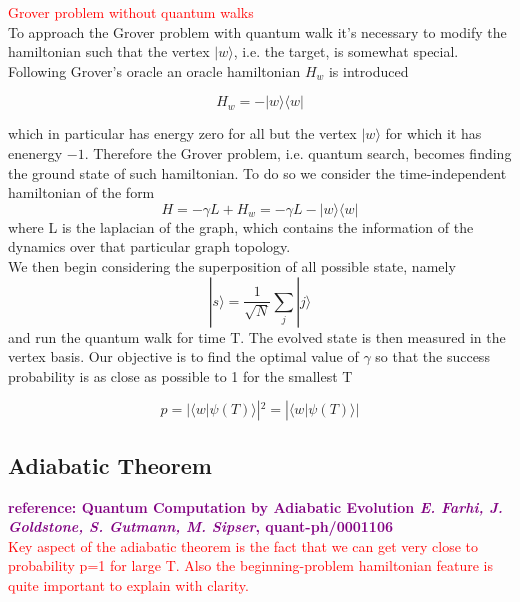 \documentclass[aps,pra,reprint, onecolumn, showkeys]{revtex4-2}
\newcommand{\red}[1]{\textcolor{red}{#1}}
\newcommand{\purple}[1]{\textcolor{purple}{\textbf{reference: #1}}}
\begin{document}
\red{Grover problem without quantum walks} \\

To approach the Grover problem with quantum walk it's necessary to modify the hamiltonian such that the vertex $|w\rangle$, i.e. the target, is somewhat special. Following Grover's oracle an oracle hamiltonian $H_w$ is introduced

\begin{equation}
  H_w = -|w\rangle\langle w|
\end{equation}

which in particular has energy zero for all but the vertex $|w\rangle$ for which it has enenergy $-1$. Therefore the Grover problem, i.e. quantum search, becomes finding the ground state of such hamiltonian. To do so we consider the time-independent hamiltonian of the form
\begin{equation}
  H = -\gamma L + H_w = -\gamma L -|w\rangle\langle w|
\end{equation}
where L is the laplacian of the graph, which contains the information of the dynamics over that particular graph topology.\\

We then begin considering the superposition of all possible state, namely
\begin{equation}
  |s\rangle = \frac{1}{\sqrt{N}}\sum_j|j\rangle
\end{equation}
and run the quantum walk for time T. The evolved state is then measured in the vertex basis. Our objective is to find the optimal value of $\gamma$ so that the success probability is as close as possible to 1 for the smallest T

\begin{equation}
 p = |\langle w|\psi(T)\rangle|^2 = |\langle w|\psi(T)\rangle|
\end{equation}


\subsection{Adiabatic Theorem}
\purple{Quantum Computation by Adiabatic Evolution \textit{E. Farhi, J. Goldstone, S. Gutmann, M. Sipser}, quant-ph/0001106 }\\
\red{Key aspect of the adiabatic theorem is the fact that we can get very close to probability p=1 for large T. Also the beginning-problem hamiltonian feature is quite important to explain with clarity.}\\
\end{document}
